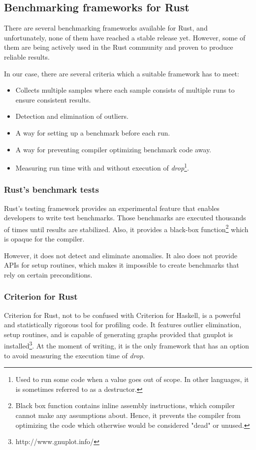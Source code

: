 \subsection{Benchmarking frameworks for Rust}
There are several benchmarking frameworks available for Rust, and unfortunately, none of them have reached a stable release yet. However, some of them are being actively used in the Rust community and proven to produce reliable results.  

In our case, there are several criteria which a suitable framework has to meet:
\begin{itemize}
    \item Collects multiple samples where each sample consists of multiple runs to ensure consistent results. 
    \item Detection and elimination of outliers.     
    \item A way for setting up a benchmark before each run. 
    \item A way for preventing compiler optimizing benchmark code away.     
    \item Measuring run time with and without execution of \emph{drop}\footnote{Used to run some code when a value goes out of scope. In other languages, it is sometimes referred to as a destructor.}.
\end{itemize}

\subsubsection*{Rust's benchmark tests}
Rust's testing framework provides an experimental feature that enables developers to write test benchmarks. Those benchmarks are executed thousands of times until results are stabilized. Also, it provides a black-box function\footnote{Black box function contains inline assembly instructions, which compiler cannot make any assumptions about. Hence, it prevents the compiler from optimizing the code which otherwise would be considered "dead" or unused.} which is opaque for the compiler. 

However, it does not detect and eliminate anomalies. It also does not provide APIs for setup routines, which makes it impossible to create benchmarks that rely on certain preconditions.

\subsubsection*{Criterion for Rust}
Criterion for Rust, not to be confused with Criterion for Haskell, is a powerful and statistically rigorous tool for profiling code. It features outlier elimination, setup routines, and is capable of generating graphs provided that gnuplot is installed\footnote{http://www.gnuplot.info/}. At the moment of writing, it is the only framework that has an option to avoid measuring the execution time of \emph{drop}. 

